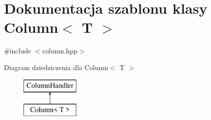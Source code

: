 \hypertarget{class_column}{}\section{Dokumentacja szablonu klasy Column$<$ T $>$}
\label{class_column}


{\ttfamily \#include $<$column.\+hpp$>$}

Diagram dziedziczenia dla Column$<$ T $>$\begin{figure}[H]
\begin{center}
\leavevmode
\includegraphics[height=2.000000cm]{class_column}
\end{center}
\end{figure}
